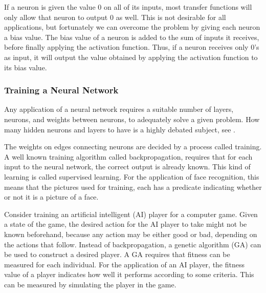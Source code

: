 If a neuron is given the value $0$ on all of its inputs, most transfer functions will only allow that neuron to output $0$ as well.
This is not desirable for all applications, but fortunately we can overcome the problem by giving each neuron a bias value.
The bias value of a neuron is added to the sum of inputs it receives, before finally applying the activation function.
Thus, if a neuron receives only $0$'s as input, it will output the value obtained by applying the activation function to its bias value.

\subsubsection{Training a Neural Network}
Any application of a neural network requires a suitable number of layers, neurons, and weights between neurons, to adequately solve a given problem. How many hidden neurons and layers to have is a highly debated subject, see \cite{sarle1997}.

The weights on edges connecting neurons are decided by a process called training.  A well known training algorithm called backpropagation, requires that for each input to the neural network, the correct output is already known\cite{backpropagation}. This kind of learning is called supervised learning. For the application of face recognition, this means that the pictures used for training, each has a predicate indicating whether or not it is a picture of a face.

Consider training an artificial intelligent (AI) player for a computer game. Given a state of the game, the desired action for the AI player to take might not be known beforehand, because any action may be either good or bad, depending on the actions that follow.  Instead of backpropagation, a genetic algorithm (GA) can be used to construct a desired player. A GA requires that fitness can be measured for each individual. For the application of an AI player, the fitness value of a player indicates how well it performs according to some criteria. This can be measured by simulating the player in the game.
